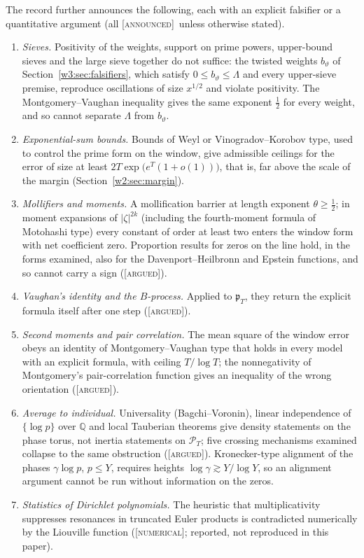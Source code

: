 \documentclass[11pt]{amsart}
\theoremstyle{definition}
\theoremstyle{remark}
\numberwithin{equation}{section}
\newcommand{\Q}{\mathbb{Q}}
\newcommand{\PT}{\mathcal{P}_T}                        %
\newcommand{\pT}{\mathfrak{p}_T}                       %
\newcommand{\stag}[1]{\textsc{[#1]}}
\newcommand{\ARGUED}{\stag{argued}}
\newcommand{\NUM}{\stag{numerical}}
\newcommand{\ANNOUNCED}{\stag{announced}}
\begin{document}
The record further announces the following, each with an explicit falsifier or a quantitative argument
(all \ANNOUNCED\ unless otherwise stated).
\begin{enumerate}[label=(\alph*)]
\item\emph{Sieves.} Positivity of the weights, support on prime powers, upper-bound sieves and the large sieve
together do not suffice: the twisted weights $b_\vartheta$ of Section~\ref{w3:sec:falsifiers}, which satisfy
$0\le b_\vartheta\le\Lambda$ and every upper-sieve premise, reproduce oscillations of size $x^{1/2}$ and violate
positivity. The Montgomery--Vaughan inequality gives the same exponent $\frac12$ for every weight, and so cannot
separate $\Lambda$ from $b_\vartheta$.
\item\emph{Exponential-sum bounds.} Bounds of Weyl or Vinogradov--Korobov type, used to control the prime form
on the window, give admissible ceilings for the error of size at least $2T\exp\big(e^{T}(1+o(1))\big)$, that is,
far above the scale of the margin (Section~\ref{w2:sec:margin}).
\item\emph{Mollifiers and moments.} A mollification barrier at length exponent $\theta\ge\frac12$; in moment
expansions of $|\zeta|^{2k}$ (including the fourth-moment formula of Motohashi type) every constant of order at
least two enters the window form with net coefficient zero. Proportion results for zeros on the line hold, in
the forms examined, also for the Davenport--Heilbronn and Epstein functions, and so cannot carry a sign
(\ARGUED).
\item\emph{Vaughan's identity and the $B$-process.} Applied to $\pT$, they return the explicit formula itself
after one step (\ARGUED).
\item\emph{Second moments and pair correlation.} The mean square of the window error obeys an identity of
Montgomery--Vaughan type that holds in every model with an explicit formula, with ceiling $T/\log T$; the
nonnegativity of Montgomery's pair-correlation function \cite{Montgomery1973} gives an inequality of the wrong
orientation (\ARGUED).
\item\emph{Average to individual.} Universality (Bagchi--Voronin), linear independence of $\{\log p\}$ over
$\Q$ and local Tauberian theorems give density statements on the phase torus, not inertia statements on
$\PT$; five crossing mechanisms examined collapse to the same obstruction (\ARGUED). Kronecker-type alignment
of the phases $\gamma\log p$, $p\le Y$, requires heights $\log\gamma\gtrsim Y/\log Y$, so an alignment argument
cannot be run without information on the zeros.
\item\emph{Statistics of Dirichlet polynomials.} The heuristic that multiplicativity suppresses resonances in
truncated Euler products is contradicted numerically by the Liouville function (\NUM; reported, not
reproduced in this paper).
\end{enumerate}
\end{document}
